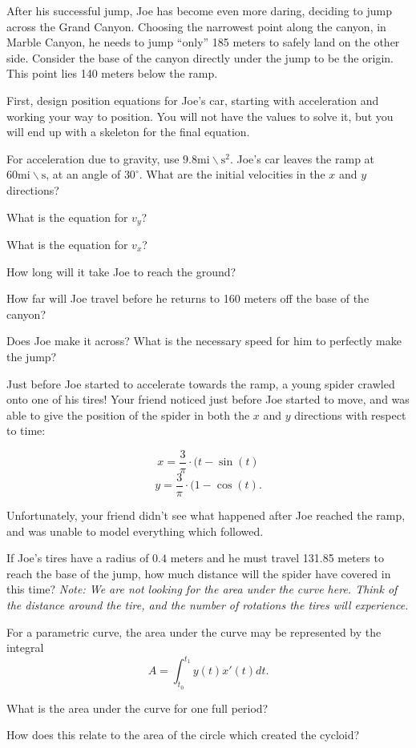 \documentclass{ximera}
\begin{document}
\begin{question}
After his successful jump, Joe has become even more daring, deciding to jump across the Grand Canyon. Choosing the narrowest point along the canyon, in Marble Canyon, he needs to jump ``only'' 185 meters to safely land on the other side. Consider the base of the canyon directly under the jump to be the origin. This point lies 140 meters below the ramp.

First, design position equations for Joe's car, starting with acceleration and working your way to position. You will not have the values to solve it, but you will end up with a skeleton for the final equation.

\begin{multipleChoice}
\end{multipleChoice}

For acceleration due to gravity, use $9.8 \text{mi} \backslash \text{s}^2$. Joe's car leaves the ramp at $60 \text{mi}\backslash \text{s}$, at an angle of $30^\circ$. What are the initial velocities in the $x$ and $y$ directions?

What is the equation for $v_{y}$?

What is the equation for $v_x$?

How long will it take Joe to reach the ground?

How far will Joe travel before he returns to 160 meters off the base of the canyon?

Does Joe make it across? What is the necessary speed for him to perfectly make the jump?
\end{question}

Just before Joe started to accelerate towards the ramp, a young spider crawled onto one of his tires! Your friend noticed just before Joe started to move, and was able to give the position of the spider in both the $x$ and $y$ directions with respect to time:

$$x = \dfrac{3}{\pi} \cdot (t - \sin(t)$$ $$y = \dfrac{3}{\pi} \cdot (1 - \cos(t)\text{.}$$

Unfortunately, your friend didn't see what happened after Joe reached the ramp, and was unable to model everything which followed.

If Joe's tires have a radius of $0.4$ meters and he must travel 131.85 meters to reach the base of the jump, how much distance will the spider have covered in this time? \textit{Note: We are not looking for the area under the curve here. Think of the distance around the tire, and the number of rotations the tires will experience.}

For a parametric curve, the area under the curve may be represented by the integral $$A = \int_{t_0}^{t_1} y(t)x'(t) dt \text{.}$$

What is the area under the curve for one full period?

How does this relate to the area of the circle which created the cycloid?
\end{document}
